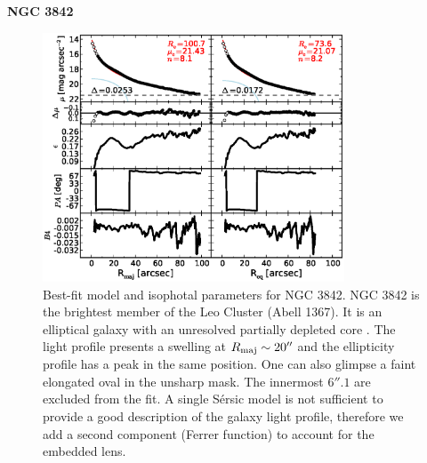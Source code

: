 \documentclass[preprint2]{emulateapj}
\newcommand{\fitfigurewidth}{0.8\textwidth}
\begin{document}
  \clearpage\newpage\noindent
  {\bf NGC 3842 \\}
  
  \begin{figure}[h]
  \begin{center}
  \includegraphics[width=\fitfigurewidth]{images/n3842exp_1Dfit.eps}
  \caption{Best-fit model and isophotal parameters for NGC 3842.
  NGC 3842 is the brightest member of the Leo Cluster (Abell 1367).
  It is an elliptical galaxy with an unresolved partially depleted core \citep{rusli2013,dullograham2014cores}. %
  The light profile presents a swelling at $R_{\rm maj} \sim 20''$ and the ellipticity profile has a peak in the same position.
  One can also glimpse a faint elongated oval in the unsharp mask.
  The innermost $6''.1$ are excluded from the fit.
  A single S\'ersic model is not sufficient to provide a good description of the galaxy light profile, 
  therefore we add a second component (Ferrer function) to account for the embedded lens.
  }
  \end{center}
  \end{figure}
\end{document}
